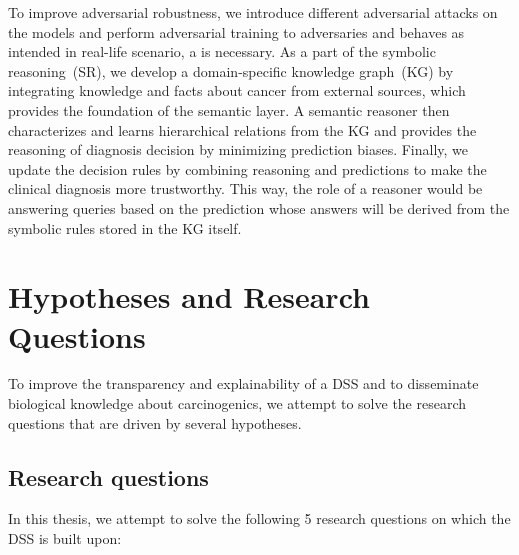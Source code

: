 \hspace*{3.5mm} To improve adversarial robustness, we introduce different adversarial attacks on the models and perform adversarial training to adversaries and behaves as intended in real-life scenario, a is necessary. As a part of the symbolic reasoning~(SR), we develop a domain-specific knowledge graph~(KG) by integrating knowledge and facts about cancer from external sources, which provides the foundation of the semantic layer. A semantic reasoner then characterizes and learns hierarchical relations from the KG and provides the reasoning of diagnosis decision by minimizing prediction biases. 
Finally, we update the decision rules by combining reasoning and predictions to make the clinical diagnosis more trustworthy. This way, the role of a reasoner would be answering queries based on the prediction whose answers will be derived from the symbolic rules stored in the KG itself.  

\section{Hypotheses and Research Questions} \label{hypotheses}
To improve the transparency and explainability of a DSS and to disseminate biological knowledge about carcinogenics, we attempt to solve the research questions that are driven by several hypotheses.  

\subsection{Research questions}
In this thesis, we attempt to solve the following 5 research questions on which the DSS is built upon:  

